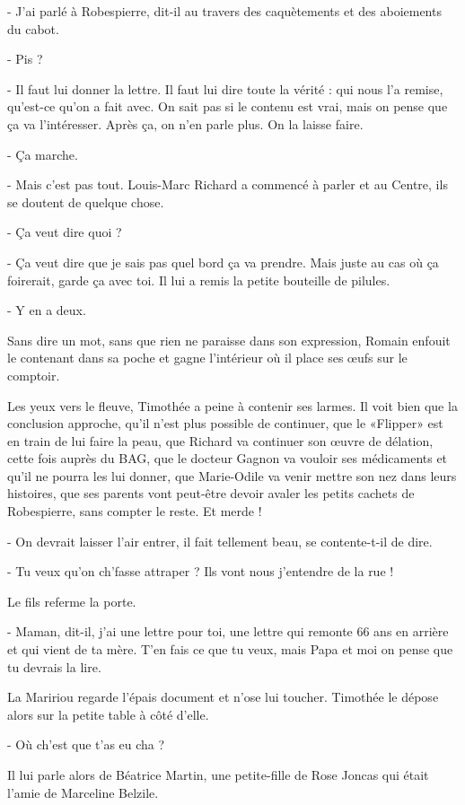 - J’ai parlé à Robespierre, dit-il au travers des caquètements et des aboiements du cabot.

- Pis ?

- Il faut lui donner la lettre. Il faut lui dire toute la vérité : qui nous l’a remise, qu’est-ce qu’on a fait avec. On sait pas si le contenu est vrai, mais on pense que ça va l’intéresser. Après ça, on n’en parle plus. On la laisse faire.

- Ça marche.

- Mais c’est pas tout. Louis-Marc Richard a commencé à parler et au Centre, ils se doutent de quelque chose.

- Ça veut dire quoi ?

- Ça veut dire que je sais pas quel bord ça va prendre. Mais juste au cas où ça foirerait, garde ça avec toi.
Il lui a remis la petite bouteille de pilules.

- Y en a deux.

Sans dire un mot, sans que rien ne paraisse dans son expression, Romain enfouit le contenant dans sa poche et gagne l’intérieur où il place ses œufs sur le comptoir.

Les yeux vers le fleuve, Timothée a peine à contenir ses larmes. Il voit bien que la conclusion approche, qu’il n’est plus possible de continuer, que le «Flipper» est en train de lui faire la peau, que Richard va continuer son œuvre de délation, cette fois auprès du BAG, que le docteur Gagnon va vouloir ses médicaments et qu’il ne pourra les lui donner, que Marie-Odile va venir mettre son nez dans leurs histoires, que ses parents vont peut-être devoir avaler les petits cachets de Robespierre, sans compter le reste. Et merde !

- On devrait laisser l’air entrer, il fait tellement beau, se contente-t-il de dire.

- Tu veux qu’on ch’fasse attraper ? Ils vont nous j’entendre de la rue !

Le fils referme la porte.

- Maman, dit-il, j’ai une lettre pour toi, une lettre qui remonte 66 ans en arrière et qui vient de ta mère. T’en fais ce que tu veux, mais Papa et moi on pense que tu devrais la lire.

La Maririou regarde l’épais document et n’ose lui toucher. Timothée le dépose alors sur la petite table à côté d’elle.

- Où ch’est que t’as eu cha ?

Il lui parle alors de Béatrice Martin, une petite-fille de Rose Joncas qui était l’amie de Marceline Belzile.

